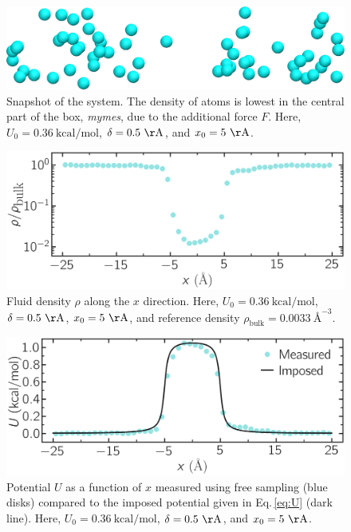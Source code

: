 \documentclass[9pt,tutorial]{livecoms}
\begin{document}
\begin{figure}
\centering
\includegraphics[width=\linewidth]{US-system-unbiased}
\caption{Snapshot of the system. The density of atoms is lowest in the central part of the box, \textit{mymes}, due to the additional force $F$. Here, $U_0 = 0.36~\text{kcal/mol}$, $\delta = 0.5~\mathrm{\AA{}}$, and $x_0 = 5~\mathrm{\AA{}}$.}
\label{fig:US-system-unbiased}
\end{figure}

\begin{figure}
\centering
\includegraphics[width=\linewidth]{US-density}
\caption{Fluid density $\rho$ along the $x$ direction. Here, $U_0 = 0.36~\text{kcal/mol}$, $\delta = 0.5~\mathrm{\AA{}}$, $x_0 = 5~\mathrm{\AA{}}$, and reference density $\rho_\text{bulk} = 0.0033~\text{\AA{}}^{-3}$.}
\label{fig:US-density}
\end{figure}

\begin{figure}
\centering
\includegraphics[width=\linewidth]{US-FreeSampling}
\caption{Potential $U$ as a function of $x$ measured using free sampling (blue disks) compared to the imposed potential given in Eq.\,\eqref{eq:U} (dark line). Here, $U_0 = 0.36~\text{kcal/mol}$, $\delta = 0.5~\mathrm{\AA{}}$, and $x_0 = 5~\mathrm{\AA{}}$.}
\label{fig:US-FreeSampling}
\end{figure}
\end{document}
